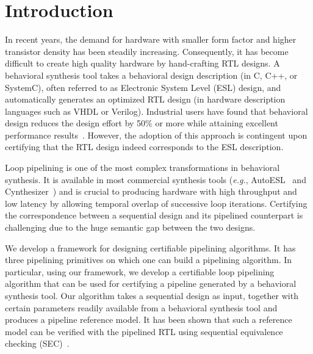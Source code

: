 \section{Introduction}
\label{sec:intro}

In recent years, the demand for hardware with smaller form factor and higher transistor density has been steadily increasing. Consequently, it has become difficult to create high quality hardware by hand-crafting RTL designs. A behavioral synthesis tool takes a behavioral
design description (in C, C++, or SystemC), often referred to as Electronic System Level (ESL) design, and automatically generates an optimized RTL design (in hardware
description languages such as VHDL or Verilog). Industrial users
have found that behavioral design reduces the design effort
by 50\% or more while attaining excellent performance results~\cite{Moussa99}. However, the adoption of this approach is
contingent upon certifying that the RTL design indeed
corresponds to the ESL description.

Loop pipelining is one of the most complex transformations in behavioral synthesis. It is available in most commercial synthesis tools ({\em e.g.}, AutoESL~\cite{autoesl} and Cynthesizer~\cite{forte}) and is
crucial to producing hardware with high throughput and low latency by allowing temporal overlap of successive loop
iterations. Certifying the correspondence between a sequential design and its pipelined counterpart is challenging due to the huge semantic gap between the two
designs.

We develop a framework for designing certifiable
pipelining algorithms. It has three pipelining primitives on which one can build a pipelining algorithm. In particular, using our framework, we develop a certifiable
loop pipelining algorithm that can be used for certifying a pipeline generated by a behavioral synthesis tool. Our algorithm takes a sequential design as input,
together with certain parameters readily available from a behavioral synthesis tool and produces a pipeline reference
model. It has been shown that such a reference model can be verified with the pipelined RTL using sequential equivalence checking (SEC)~\cite{hrx:dac-12}.


